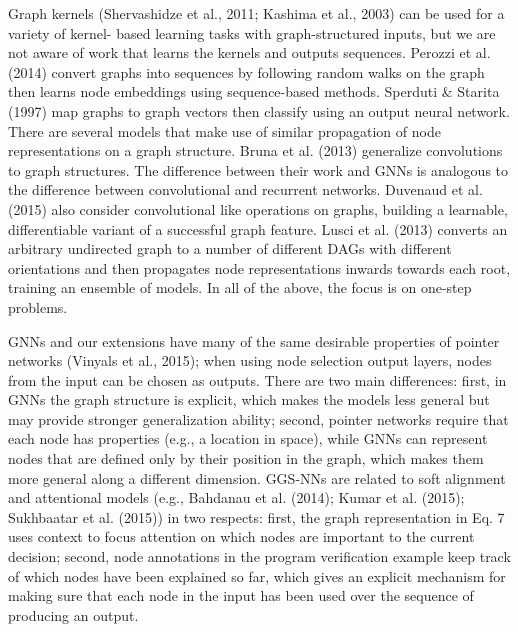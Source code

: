 \documentclass{article}
\begin{document}
Graph kernels (Shervashidze et al., 2011; Kashima et al., 2003) can be used for a variety of kernel- based learning tasks with graph-structured inputs, but we are not aware of work that learns the kernels and outputs sequences. Perozzi et al. (2014) convert graphs into sequences by following random walks on the graph then learns node embeddings using sequence-based methods. Sperduti & Starita (1997) map graphs to graph vectors then classify using an output neural network. There are several models that make use of similar propagation of node representations on a graph structure. Bruna et al. (2013) generalize convolutions to graph structures. The difference between their work and GNNs is analogous to the difference between convolutional and recurrent networks. Duvenaud et al. (2015) also consider convolutional like operations on graphs, building a learnable, differentiable variant of a successful graph feature. Lusci et al. (2013) converts an arbitrary undirected graph to a number of different DAGs with different orientations and then propagates node representations inwards towards each root, training an ensemble of models. In all of the above, the focus is on one-step problems.

GNNs and our extensions have many of the same desirable properties of pointer networks (Vinyals et al., 2015); when using node selection output layers, nodes from the input can be chosen as outputs. There are two main differences: first, in GNNs the graph structure is explicit, which makes the models less general but may provide stronger generalization ability; second, pointer networks require that each node has properties (e.g., a location in space), while GNNs can represent nodes that are defined only by their position in the graph, which makes them more general along a different dimension.
GGS-NNs are related to soft alignment and attentional models (e.g., Bahdanau et al. (2014); Kumar et al. (2015); Sukhbaatar et al. (2015)) in two respects: first, the graph representation in Eq. 7 uses context to focus attention on which nodes are important to the current decision; second, node annotations in the program verification example keep track of which nodes have been explained so far, which gives an explicit mechanism for making sure that each node in the input has been used over the sequence of producing an output.
\end{document}
